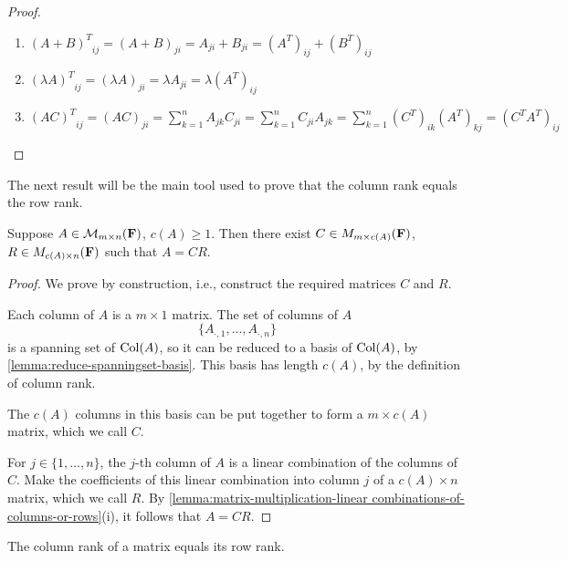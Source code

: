 \begin{proof} \
\begin{enumerate}[label=(\roman*)]
\item ${(A+B)^T}_{ij}=(A+B)_{ji}=A_{ji}+B_{ji}=(A^T)_{ij}+(B^T)_{ij}$
\item ${(\lambda A)^T}_{ij}=(\lambda A)_{ji}=\lambda A_{ji}=\lambda (A^T)_{ij}$
\item ${(AC)^T}_{ij}=(AC)_{ji}=\sum_{k=1}^{n}A_{jk}C_{ji}=\sum_{k=1}^{n}C_{ji}A_{jk}=\sum_{k=1}^{n}(C^T)_{ik}(A^T)_{kj}=(C^T A^T)_{ij}$
\end{enumerate}
\end{proof}

The next result will be the main tool used to prove that the column rank equals the row rank.

\begin{proposition}\label{prop:column-row-factorisation}
Suppose $A\in\mathcal{M}_{m\times n}(\mathbf F)$, $c(A)\ge1$. Then there exist $C\in M_{m\times c(A)}(\mathbf F)$, $R\in M_{c(A)\times n}(\mathbf F)$ such that $A=CR$.
\end{proposition}

\begin{proof}
We prove by construction, i.e., construct the required matrices $C$ and $R$.

Each column of $A$ is a $m\times1$ matrix. The set of columns of $A$
\[\{A_{\cdot,1},\dots,A_{\cdot,n}\}\]
is a spanning set of $\operatorname{Col}(A)$, so it can be reduced to a basis of $\operatorname{Col}(A)$, by \ref{lemma:reduce-spanningset-basis}. This basis has length $c(A)$, by the definition of column rank. 

The $c(A)$ columns in this basis can be put together to form a $m\times c(A)$ matrix, which we call $C$.

For $j\in\{1,\dots,n\}$, the $j$-th column of $A$ is a linear combination of the columns of $C$. Make the coefficients of this linear combination into column $j$ of a $c(A)\times n$ matrix, which we call $R$. By \ref{lemma:matrix-multiplication-linear combinations-of-columns-or-rows}(i), it follows that $A=CR$.
\end{proof}

\begin{theorem}\label{thrm:column-rank-equals-row-rank}
The column rank of a matrix equals its row rank.
\end{theorem}

